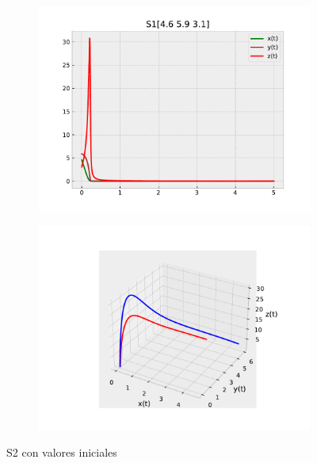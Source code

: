 \documentclass{wscpaperproc}
\theoremstyle{wsc}
\begin{document}
\begin{figure}[h]
	\centering
	\begin{subfigure}[b]{0.5\textwidth}
		\centering
		\includegraphics[width=\textwidth]{Simulations/S1[4.6 5.9 3.1].pdf}
	
		\label{fig:comparativa21}
	\end{subfigure}%
	\begin{subfigure}[b]{0.5\textwidth}
		\centering
		\includegraphics[width=\textwidth]{Simulations/S13d.pdf}
		\label{fig:comparativa22}
	\end{subfigure}
	\caption{S2 con valores iniciales}

	\label{fig:comparacion2}
\end{figure}
\end{document}
